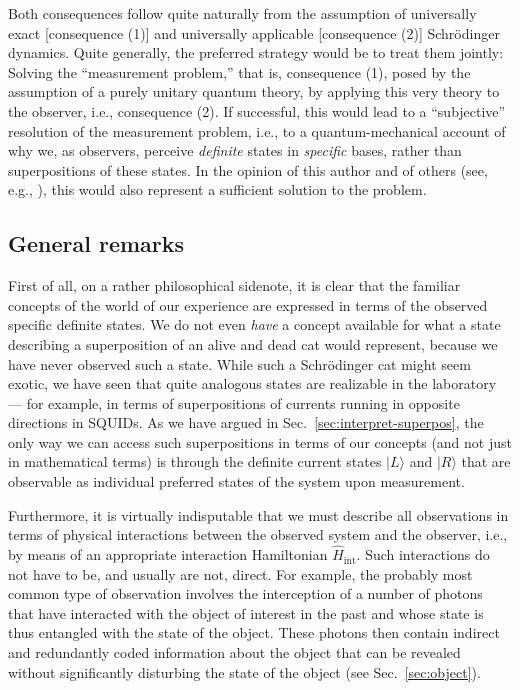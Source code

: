 \documentclass[twocolumn,aps,floatfix,amsmath,amssymb,showpacs,nofootinbib]{revtex4}
\newcommand{\ket}[1]{\ensuremath{|{#1\rangle}}}
\begin{document}
Both consequences follow quite naturally from the assumption of
universally exact [consequence (1)] and universally applicable
[consequence (2)] Schr\"odinger dynamics.  Quite generally, the
preferred strategy would be to treat them jointly: Solving the
``measurement problem,'' that is, consequence (1), posed by the
assumption of a purely unitary quantum theory, by applying this very
theory to the observer, i.e., consequence (2). If successful, this
would lead to a ``subjective'' resolution of the measurement problem,
i.e., to a quantum-mechanical account of why we, as observers,
perceive {\it definite} states in {\it specific} bases, rather than
superpositions of these states.  In the opinion of this author
\cite{Schlosshauer:2003:tv} and of others (see, e.g.,
\cite{Zeh:1973:wq,Zurek:1998:re,Espagnat:2000:uy,Zeh:2000:rr,Zurek:2002:ii}),
this would also represent a sufficient solution to the problem.


\subsection{General remarks}

First of all, on a rather philosophical sidenote, it is clear that the
familiar concepts of the world of our experience are expressed in
terms of the observed specific definite states.  We do not even {\it
  have} a concept available for what a state describing a
superposition of an alive and dead cat would represent, because we
have never observed such a state. While such a Schr\"odinger cat might
seem exotic, we have seen that quite analogous states are realizable
in the laboratory --- for example, in terms of superpositions of
currents running in opposite directions in SQUIDs.  As we have argued
in Sec.~\ref{sec:interpret-superpos}, the only way we can access such
superpositions in terms of our concepts (and not just in mathematical
terms) is through the definite current states $\ket{L}$ and $\ket{R}$
that are observable as individual preferred states of the system upon
measurement.

Furthermore, it is virtually indisputable that we must describe all
observations in terms of physical interactions between the observed
system and the observer, i.e., by means of an appropriate interaction
Hamiltonian $\widehat{H}_\text{int}$.  Such interactions do not have
to be, and usually are not, direct. For example, the probably most
common type of observation involves the interception of a number of
photons that have interacted with the object of interest in the past
and whose state is thus entangled with the state of the object.  These
photons then contain indirect and redundantly coded information about
the object that can be revealed without significantly disturbing the
state of the object (see Sec.~\ref{sec:object}).
\end{document}
